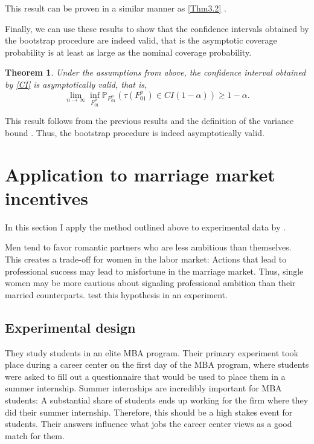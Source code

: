 \documentclass[aodsor,preprint]{imsart}
\numberwithin{equation}{section}
\theoremstyle{plain}
\newtheorem{thm}{Theorem}[section]
\begin{document}
This result can be proven in a similar manner as \ref{Thm3.2} \citep[see][section 5 and Appendix C]{Imbens_2021}.

Finally, we can use these results to show that the confidence intervals obtained by the bootstrap procedure are indeed valid, that is the asymptotic coverage probability is at least as large as the nominal coverage probability.

\begin{thm}
	Under the assumptions from above, the confidence interval obtained by \ref{CI} is asymptotically valid, that is,
	$$
	\lim_{n \to \infty} \inf_{F_{01}^p} \mathbb{P}_{F_{01}^p} (\tau(F_{01}^p) \in CI(1-\alpha)) \geq 1 - \alpha.
	$$
\end{thm}

This result follows from the previous results and the definition of the variance bound \citep[see][Corollary 5.1]{Imbens_2021}. Thus, the bootstrap procedure is indeed asymptotically valid.



\section{Application to marriage market incentives} \label{application}

In this section I apply the method outlined above to experimental data by \cite{Bursztyn_2017}. 

Men tend to favor romantic partners who are less ambitious than themselves. This creates a trade-off for women in the labor market: Actions that lead to professional success may lead to misfortune in the marriage market. Thus, single women may be more cautious about signaling professional ambition than their married counterparts. \cite{Bursztyn_2017} test this hypothesis in an experiment.

\subsection{Experimental design}
They study students in an elite MBA program. Their primary experiment took place during a career center on the first day of the MBA program, where students were asked to fill out a questionnaire that would be used to place them in a summer internship. Summer internships are incredibly important for MBA students: A substantial share of students ends up working for the firm where they did their summer internship. Therefore, this should be a high stakes event for students. Their answers influence what jobs the career center views as a good match for them.
\end{document}
